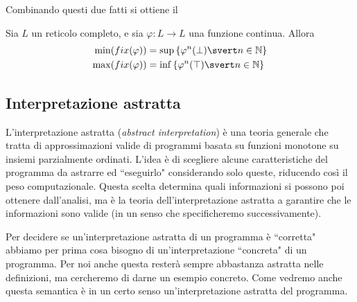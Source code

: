 \documentclass[12pt]{article}
\numberwithin{theorem}{subsection}
\newcommand{\setN}{\mathbb{N}}
\begin{document}
Combinando questi due fatti si ottiene il

\begin{corollary}
	Sia $L$ un reticolo completo, e sia $\varphi : L \rightarrow L$ una funzione continua. Allora
	\begin{align*}
		\min(fix(\varphi)) &= \sup \left\lbrace \varphi^n (\bot) \svert n \in \setN \right\rbrace \\
		\max(fix(\varphi)) &= \inf \left\lbrace \varphi^n (\top) \svert n \in \setN \right\rbrace
	\end{align*}
\end{corollary}

\subsection{Interpretazione astratta}
L'interpretazione astratta (\textit{abstract interpretation}) è una teoria generale che tratta di approssimazioni valide di programmi basata su funzioni monotone su insiemi parzialmente ordinati. L'idea è di scegliere alcune caratteristiche del programma da astrarre ed ``eseguirlo" considerando solo queste, riducendo così il peso computazionale. Questa scelta determina quali informazioni si possono poi ottenere dall'analisi, ma è la teoria dell'interpretazione astratta a garantire che le informazioni sono valide (in un senso che specificheremo successivamente).

Per decidere se un'interpretazione astratta di un programma è ``corretta" abbiamo per prima cosa bisogno di un'interpretazione ``concreta" di un programma. Per noi anche questa resterà sempre abbastanza astratta nelle definizioni, ma cercheremo di darne un esempio concreto. Come vedremo anche questa semantica è in un certo senso un'interpretazione astratta del programma.
\end{document}
